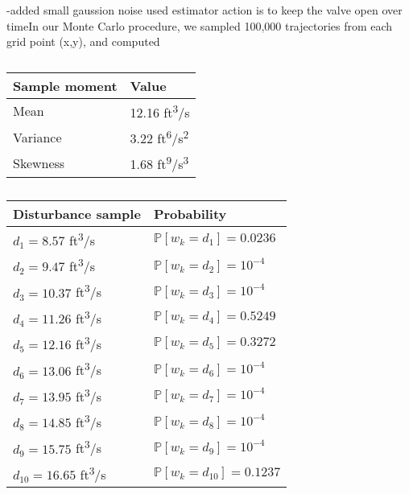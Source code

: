 \documentclass[letterpaper, 10 pt, conference]{ieeeconf}  %
\begin{document}
-added small gaussion noise used estimator
 action is to keep
the valve open over timeIn our Monte Carlo procedure, we sampled 100,000 trajectories from each grid point (x,y), and computed 


\begin{table}
\begin{center}
\caption{}
\begin{tabular}{| p{2cm} | p{2cm} |}
\hline
\bf{Sample moment} & \bf{Value}  \\ \hline
Mean & 12.16 ft\textsuperscript{3}/s \\ \hline
Variance & 3.22 ft\textsuperscript{6}/s\textsuperscript{2} \\ \hline
Skewness & 1.68 ft\textsuperscript{9}/s\textsuperscript{3} \\ \hline
\end{tabular}
\begin{flushleft} \end{flushleft}
\label{stats}
\end{center}
\end{table}

\begin{table}
\begin{center}
\caption{}
\begin{tabular}{| p{3cm} | p{3cm} |}
\hline
\bf{Disturbance sample} & \bf{Probability} \\ \hline
$d_1 = 8.57$ ft\textsuperscript{3}/s & $\mathbb{P}[w_k = d_1] = 0.0236$ \\ \hline
$d_2 = 9.47$ ft\textsuperscript{3}/s & $\mathbb{P}[w_k = d_2] = 10^{-4}$ \\ \hline
$d_3 = 10.37$ ft\textsuperscript{3}/s & $\mathbb{P}[w_k = d_3] = 10^{-4}$ \\ \hline
$d_4 = 11.26$ ft\textsuperscript{3}/s & $\mathbb{P}[w_k = d_4] = 0.5249$ \\ \hline
$d_5 = 12.16$ ft\textsuperscript{3}/s & $\mathbb{P}[w_k = d_5] = 0.3272$ \\ \hline
$d_6 = 13.06$ ft\textsuperscript{3}/s & $\mathbb{P}[w_k = d_6] = 10^{-4}$ \\ \hline
$d_7 = 13.95$ ft\textsuperscript{3}/s & $\mathbb{P}[w_k = d_7] = 10^{-4}$ \\ \hline
$d_8 = 14.85$ ft\textsuperscript{3}/s & $\mathbb{P}[w_k = d_8] = 10^{-4}$ \\ \hline
$d_9 = 15.75$ ft\textsuperscript{3}/s & $\mathbb{P}[w_k = d_9] = 10^{-4}$ \\ \hline
$d_{10} = 16.65$ ft\textsuperscript{3}/s & $\mathbb{P}[w_k = d_{10}] = 0.1237$ \\ \hline
\end{tabular}
\begin{flushleft} \end{flushleft}
\label{dist}
\end{center}
\end{table}
\end{document}
